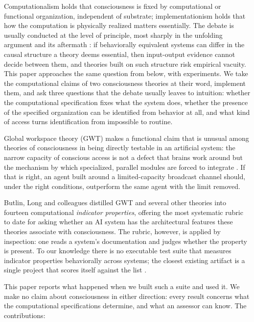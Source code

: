 \documentclass[11pt]{article}
\begin{document}
Computationalism holds that consciousness is fixed by computational or functional
organization, independent of substrate; implementationism holds that how the
computation is physically realized matters essentially. The debate is usually
conducted at the level of principle, most sharply in the unfolding argument and
its aftermath \cite{doerig2019}: if behaviorally equivalent systems can
differ in the causal structure a theory deems essential, then input-output
evidence cannot decide between them, and theories built on such structure risk
empirical vacuity. This paper approaches the same question from below, with
experiments. We take the computational claims of two consciousness theories at
their word, implement them, and ask three questions that the debate usually
leaves to intuition: whether the computational specification fixes what the
system does, whether the presence of the specified organization can be identified
from behavior at all, and what kind of access turns identification from
impossible to routine.

Global workspace theory (GWT) makes a functional claim that is unusual among
theories of consciousness in being directly testable in an artificial system: the
narrow capacity of conscious access is not a defect that brains work around but the
mechanism by which specialized, parallel modules are forced to integrate
\cite{baars1988,dehaene2014}. If that is right, an agent built around a
limited-capacity broadcast channel should, under the right conditions, outperform
the same agent with the limit removed.

Butlin, Long and colleagues \cite{butlin2023,butlin2025} distilled GWT and several
other theories into fourteen computational \emph{indicator properties}, offering
the most systematic rubric to date for asking whether an AI system has the
architectural features these theories associate with consciousness. The rubric,
however, is applied by inspection: one reads a system's documentation and judges
whether the property is present. To our knowledge there is no executable test suite
that measures indicator properties behaviorally across systems; the closest
existing artifact is a single project that scores itself against the list
\cite{tlcdv2026}.

This paper reports what happened when we built such a suite and used it. We make
no claim about consciousness in either direction: every result concerns what the
computational specifications determine, and what an assessor can know. The
contributions:
\end{document}
